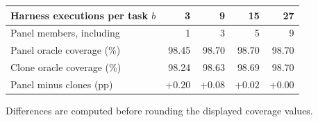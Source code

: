 \begin{tabular}{@{}lrrrr@{}}
\toprule
Harness executions per task $b$ & 3 & 9 & 15 & 27 \\
\midrule
Panel members, including \bare{} & 1 & 3 & 5 & 9 \\
Panel oracle coverage (\%) & 98.45 & 98.70 & 98.70 & 98.70 \\
Clone oracle coverage (\%) & 98.24 & 98.63 & 98.69 & 98.70 \\
Panel minus clones (pp) & $+0.20$ & $+0.08$ & $+0.02$ & $+0.00$ \\
\bottomrule
\end{tabular}


{\scriptsize Differences are computed before rounding the displayed coverage values.}
